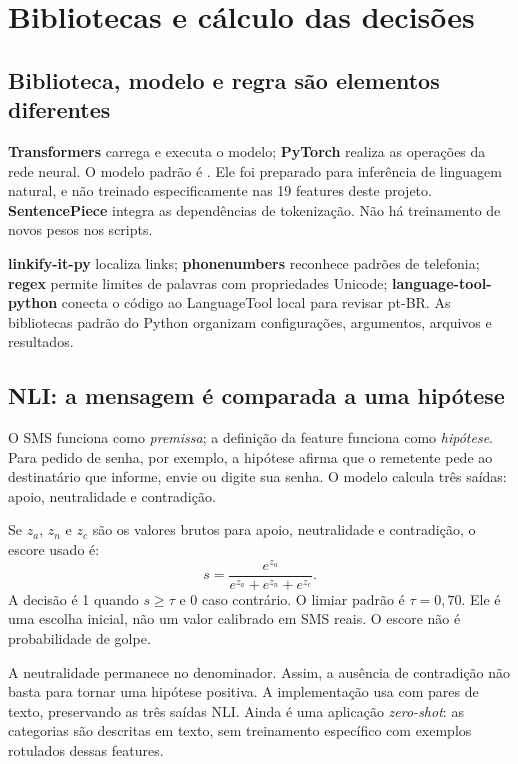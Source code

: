 \section{Bibliotecas e cálculo das decisões}
\subsection{Biblioteca, modelo e regra são elementos diferentes}
\textbf{Transformers} carrega e executa o modelo; \textbf{PyTorch} realiza as operações da rede neural. O modelo padrão é \allowbreak{}. Ele foi preparado para inferência de linguagem natural, e não treinado especificamente nas 19 features deste projeto. \textbf{SentencePiece} integra as dependências de tokenização. Não há treinamento de novos pesos nos scripts.

\textbf{linkify-it-py} localiza links; \textbf{phonenumbers} reconhece padrões de telefonia; \textbf{regex} permite limites de palavras com propriedades Unicode; \textbf{language-tool-python} conecta o código ao LanguageTool local para revisar pt-BR. As bibliotecas padrão do Python organizam configurações, argumentos, arquivos e resultados.

\subsection{NLI: a mensagem é comparada a uma hipótese}
O SMS funciona como \textit{premissa}; a definição da feature funciona como \textit{hipótese}. Para pedido de senha, por exemplo, a hipótese afirma que o remetente pede ao destinatário que informe, envie ou digite sua senha. O modelo calcula três saídas: apoio, neutralidade e contradição.

\begin{caixainfo}
Se $z_a$, $z_n$ e $z_c$ são os valores brutos para apoio, neutralidade e contradição, o escore usado é:
\[
 s = \frac{e^{z_a}}{e^{z_a}+e^{z_n}+e^{z_c}}.
\]
A decisão é 1 quando $s \geq \tau$ e 0 caso contrário. O limiar padrão é $\tau=0{,}70$. Ele é uma escolha inicial, não um valor calibrado em SMS reais. O escore não é probabilidade de golpe.
\end{caixainfo}

A neutralidade permanece no denominador. Assim, a ausência de contradição não basta para tornar uma hipótese positiva. A implementação usa  com pares de texto, preservando as três saídas NLI. Ainda é uma aplicação \textit{zero-shot}: as categorias são descritas em texto, sem treinamento específico com exemplos rotulados dessas features.

